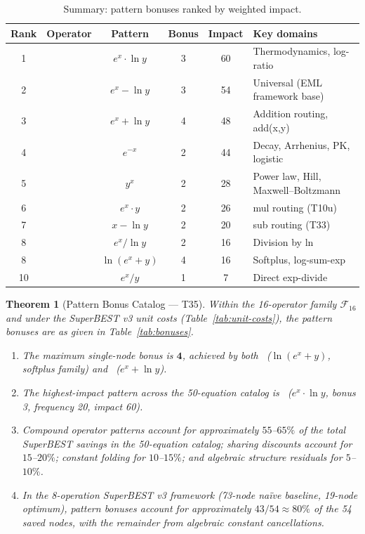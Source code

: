 \documentclass[12pt,a4paper]{article}
\newtheorem{theorem}{Theorem}[section]
\theoremstyle{definition}
\newcommand{\EML}{\operatorname{EML}}
\newcommand{\EDL}{\operatorname{EDL}}
\newcommand{\EXL}{\operatorname{EXL}}
\newcommand{\EAL}{\operatorname{EAL}}
\newcommand{\DEML}{\operatorname{DEML}}
\newcommand{\ELAd}{\operatorname{ELAd}}
\newcommand{\ELSb}{\operatorname{ELSb}}
\newcommand{\LEAd}{\operatorname{LEAd}}
\newcommand{\LEdiv}{\operatorname{LEdiv}}
\newcommand{\EPL}{\operatorname{EPL}}
\begin{document}
\begin{table}[h]
\centering
\caption{Summary: pattern bonuses ranked by weighted impact.}
\label{tab:summary}
\smallskip
\begin{tabular}{@{}clcccl@{}}
\toprule
\textbf{Rank} & \textbf{Operator} & \textbf{Pattern} & \textbf{Bonus}
  & \textbf{Impact} & \textbf{Key domains} \\
\midrule
1 & \EXL  & $e^x \cdot \ln y$  & 3 & 60 & Thermodynamics, log-ratio \\
2 & \EML  & $e^x - \ln y$      & 3 & 54 & Universal (EML framework base) \\
3 & \EAL  & $e^x + \ln y$      & 4 & 48 & Addition routing, add(x,y) \\
4 & \DEML & $e^{-x}$           & 2 & 44 & Decay, Arrhenius, PK, logistic \\
5 & \EPL  & $y^x$              & 2 & 28 & Power law, Hill, Maxwell--Boltzmann \\
6 & \ELAd & $e^x \cdot y$      & 2 & 26 & mul routing (T10u) \\
7 & \LEdiv& $x - \ln y$        & 2 & 20 & sub routing (T33) \\
8 & \EDL  & $e^x / \ln y$      & 2 & 16 & Division by ln \\
8 & \LEAd & $\ln(e^x+y)$       & 4 & 16 & Softplus, log-sum-exp \\
10 & \ELSb & $e^x / y$         & 1 &  7 & Direct exp-divide \\
\bottomrule
\end{tabular}
\end{table}

\begin{theorem}[Pattern Bonus Catalog --- T35]
\label{thm:T35}
Within the 16-operator family $\mathcal{F}_{16}$ and under the SuperBEST v3
unit costs (Table~\ref{tab:unit-costs}), the pattern bonuses are as given in
Table~\ref{tab:bonuses}.
\begin{enumerate}
  \item The maximum single-node bonus is $\mathbf{4}$, achieved by both
        \LEAd\ ($\ln(e^x+y)$, softplus family) and \EAL\ ($e^x + \ln y$).
  \item The highest-impact pattern across the 50-equation catalog is \EXL\
        ($e^x \cdot \ln y$, bonus 3, frequency 20, impact 60).
  \item Compound operator patterns account for approximately
        $55$--$65\%$ of the total SuperBEST savings in the 50-equation
        catalog; sharing discounts account for $15$--$20\%$; constant
        folding for $10$--$15\%$; and algebraic structure residuals for
        $5$--$10\%$.
  \item In the 8-operation SuperBEST v3 framework (73-node na\"{i}ve baseline,
        19-node optimum), pattern bonuses account for approximately $43/54
        \approx 80\%$ of the 54 saved nodes, with the remainder from
        algebraic constant cancellations.
\end{enumerate}
\end{theorem}
\end{document}
